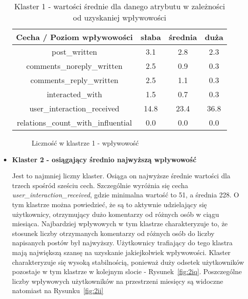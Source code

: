 \documentclass[polish,12pt]{aghthesis}
\begin{document}
\begin{itemize}
    \begin{table}[ht]
    \centering
  \begin{center}
\begin{tabular}{ |c|c|c|c| } 
\hline
 Cecha / Poziom wpływowości & słaba & średnia & duża \\ [0.5ex] 
 \hline
post\_written & 3.1 & 2.8 & 2.3 \\
\hline
comments\_noreply\_written & 2.5 & 0.9 & 0.3 \\
\hline
comments\_reply\_written & 2.5 & 1.1 & 0.3 \\
\hline
interacted\_with & 1.5 & 0.7 & 0.3 \\
\hline
user\_interaction\_received & 14.8 & 23.4 & 36.8 \\
\hline
relations\_count\_with\_influential & 0.0 & 0.0 & 0.0 \\
\hline
\end{tabular}
\end{center}
\caption{Klaster 1 - wartości średnie dla danego atrybutu w zależności od uzyskaniej wpływowości}
\label{tab:inf_1}
\end{table}

\FloatBarrier

        \begin{figure}[ht] 
    \centering
    \hfill%
    \caption{Liczność w klastrze 1 - wpływowość}
    \label{f:1i}
    \end{figure}



\item \textbf{Klaster 2 - osiągający średnio najwyższą wpływowość}

Jest to najmniej liczny klaster. Osiąga on najwyższe średnie wartości dla trzech spośród sześciu cech. Szczególnie wyróżnia się cecha \textit{user\_interaction\_received}, gdzie minimalna wartość to 51, a średnia 228. O tym klastrze można powiedzieć, że są to aktywnie udzielający się użytkownicy, otrzymujący dużo komentarzy od różnych osób w ciągu miesiąca. Najbardziej wpływowych w tym klastrze charakteryzuje to, że stosunek liczby otrzymanych komentarzy od różnych osób do liczby napisanych postów był najwyższy. Użytkownicy trafiający do tego klastra mają największą szansę na uzyskanie jakiejkolwiek wpływowości. Klaster charakteryzuje się wysoką stabilnością, ponieważ duży odsetek użytkowników pozostaje w tym klastrze w kolejnym slocie - Rysunek~\ref{fig:2iq}. Poszczególne liczby wpływowych użytkowników na przestrzeni miesięcy są widoczne natomiast na Rysunku~\ref{fig:2ii}


\end{itemize}
\end{document}
